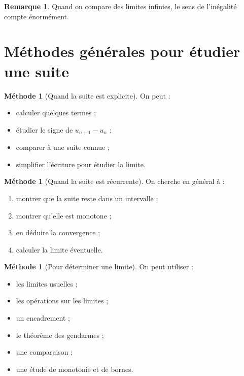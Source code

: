 \documentclass[11pt,a4paper]{article}
\theoremstyle{definition}
\newtheorem{remarque}[definition]{Remarque}
\newtheorem{methode}[definition]{Méthode}
\theoremstyle{plain}
\theoremstyle{remark}
\begin{document}
\begin{remarque}
Quand on compare des limites infinies, le sens de l'inégalité compte énormément.
\end{remarque}

\section{Méthodes générales pour étudier une suite}

\begin{methode}[Quand la suite est explicite]
On peut :
\begin{itemize}[leftmargin=0.8cm]
    \item calculer quelques termes ;
    \item étudier le signe de $u_{n+1}-u_n$ ;
    \item comparer à une suite connue ;
    \item simplifier l'écriture pour étudier la limite.
\end{itemize}
\end{methode}

\begin{methode}[Quand la suite est récurrente]
On cherche en général à :
\begin{enumerate}[label=\arabic*.]
    \item montrer que la suite reste dans un intervalle ;
    \item montrer qu'elle est monotone ;
    \item en déduire la convergence ;
    \item calculer la limite éventuelle.
\end{enumerate}
\end{methode}

\begin{methode}[Pour déterminer une limite]
On peut utiliser :
\begin{itemize}[leftmargin=0.8cm]
    \item les limites usuelles ;
    \item les opérations sur les limites ;
    \item un encadrement ;
    \item le théorème des gendarmes ;
    \item une comparaison ;
    \item une étude de monotonie et de bornes.
\end{itemize}
\end{methode}
\end{document}
